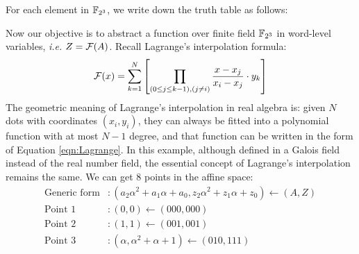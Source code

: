 \begin{Example}
For each element in $\F_{2^3}$, we write down the truth table as follows:
\begin{table}[H]
\label{tab:truthtable}
\caption{Truth table for mappings in $\mathbb{B}^3$ and $\F_{2^3}$}
\end{table}
Now our objective is to abstract a function over finite field $\F_{2^3}$ in word-level variables, {\it i.e.} 
$Z = {\mathcal{F}}(A)$. Recall Lagrange's interpolation formula:
\begin{equation}
\label{eqn:Lagrange}
{\mathcal{F}}(x) =  \sum_{k=1}^N \left[ \prod_{(0\leq j \leq k-1),(j\neq i)}\frac{x-x_j}{x_i-x_j} \cdot y_k \right]
\end{equation}
The geometric meaning of Lagrange's interpolation in real algebra is: given $N$ dots with coordinates $(x_i,y_i)$,
they can always be fitted into a polynomial function with at most $N-1$ degree, and that function can be 
written in the form of Equation \ref{eqn:Lagrange}. In this example, although defined in a Galois field instead of 
the real number field, the essential concept of Lagrange's interpolation remains the same. 
We can get 8 points in the affine space:
\begin{align*}
\text{Generic form}&: (a_2\alpha^2+a_1\alpha+a_0,z_2\alpha^2+z_1\alpha+z_0) \gets (A,Z) \\
\text{Point }1&: (0, 0) \gets (000,000) \\
\text{Point }2&: (1,1) \gets (001,001) \\
\text{Point }3&:  (\alpha,\alpha^2 + \alpha + 1) \gets (010,111)\\

\end{align*}
\end{Example}
